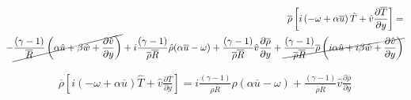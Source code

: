 \begin{equation*} 
\begin{split} 
\overline{\rho}
\left[
    i
    \left(
    -
    \omega 
    +
    \alpha 
    \overline{u}
    \right)
    \hat{T}
    +
    \hat{v}
    \frac{\partial \overline{T} }{\partial y}
\right]
=
\\
-
\cancel{
\frac{(\gamma-1)}{\overline{R}}
\left(
\alpha
\hat{u}
+
\beta
\hat{w}
+
\frac{\partial \hat{v}}{\partial y}
\right)
}
+
i
\frac{(\gamma-1)}{\overline{\rho}\overline{R}}
\hat{\rho}
(\alpha\overline{u}- \omega) 
+
\frac{(\gamma-1)}{\overline{\rho}\overline{R}}
\hat{v}
\frac{\partial \overline{\rho}}{\partial y} 
+
\cancel{
\frac{(\gamma-1)}{\overline{\rho}\overline{R}}
\overline{\rho}
\left(
i
\alpha
\hat{u}
+
i
\beta
\hat{w}
+
\frac{\partial \hat{v}}{\partial y}
\right)
}
\end{split} 
\end{equation*} 

\begin{equation*} 
\begin{split} 
\overline{\rho}
\left[
    i
    \left(
    -
    \omega 
    +
    \alpha 
    \overline{u}
    \right)
    \hat{T}
    +
    \hat{v}
    \frac{\partial \overline{T} }{\partial y}
\right]
=
i
\frac{(\gamma-1)}{\overline{\rho}\overline{R}}
\hat{\rho}
(\alpha\overline{u}- \omega) 
+
\frac{(\gamma-1)}{\overline{\rho}\overline{R}}
\hat{v}
\frac{\partial \overline{\rho}}{\partial y} 
\end{split} 
\end{equation*} 
